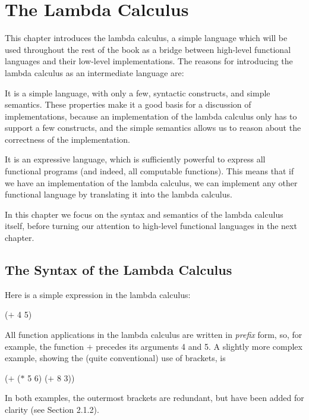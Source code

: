 \chapter{The Lambda Calculus}

This chapter introduces the lambda calculus, a simple language which will be
used throughout the rest of the book as a bridge between high-level functional
languages and their low-level implementations. The reasons for introducing
the lambda calculus as an intermediate language are:
\begin{numbered}
\item It is a simple language, with only a few, syntactic constructs, and simple
semantics. These properties make it a good basis for a discussion of
implementations, because an implementation of the lambda calculus only
has to support a few constructs, and the simple semantics allows us to
reason about the correctness of the implementation.
\item It is an expressive language, which is sufficiently powerful to express all
functional programs (and indeed, all computable functions). This means
that if we have an implementation of the lambda calculus, we can
implement any other functional language by translating it into the lambda
calculus.
\end{numbered}
In this chapter we focus on the syntax and semantics of the lambda calculus
itself, before turning our attention to high-level functional languages in the
next chapter.

\section{The Syntax of the Lambda Calculus}

Here is a simple expression in the lambda calculus:
\begin{mlcoded}
($+$ 4 5)
\end{mlcoded}
All function applications in the lambda calculus are written in \textit{prefix} form, so,
for example, the function $+$ precedes its arguments 4 and 5. A slightly more
complex example, showing the (quite conventional) use of brackets, is
\begin{mlcoded}
($+$ ($*$ 5 6) ($+$ 8 3))
\end{mlcoded}
In both examples, the outermost brackets are redundant, but have been
added for clarity (see Section 2.1.2).

